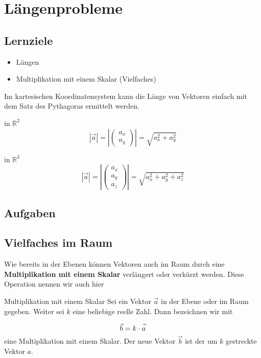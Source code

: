 \section{Längenprobleme}

\subsection*{Lernziele}
\begin{itemize}
\item Längen
\item Multiplikation mit einem Skalar (Vielfaches)
\end{itemize}

Im kartesischen Koordinatensystem kann die Länge von Vektoren einfach
mit dem Satz des Pythagoras ermittelt werden.

\begin{gesetz}{in $\mathbb{R}^2$}{}
  $$|\vec{a}| = \left| \begin{pmatrix} a_x\\a_y\end{pmatrix}  \right|   = \sqrt{a_x^2 + a_y^2}$$
\end{gesetz}

\begin{gesetz}{in $\mathbb{R}^3$}{}
  $$|\vec{a}| =  \left|\begin{pmatrix}a_x\\a_y\\a_z\end{pmatrix}\right| = \sqrt{a_x^2 + a_y^2 + a_z^2}$$
\end{gesetz}


\subsection*{Aufgaben}

\newpage


\subsection{Vielfaches im
  Raum}
Wie bereits in der Ebenen können Vektoren auch im Raum durch eine
\textbf{Multiplikation mit einem Skalar} verlängert oder
verkürzt werden. Diese Operation nennen wir auch hier 

\begin{definition}{Multiplikation mit einem Skalar}{}
  Sei ein Vektor $\vec{a}$ in der Ebene oder im Raum gegeben. Weiter
  sei $k$ eine beliebige reelle Zahl. Dann bezeichnen wir mit
  
  $$\vec{b} = k \cdot{} \vec{\vphantom{b}a}$$
  eine Multiplikation mit einem Skalar. Der neue Vektor $\vec{b}$ ist
  der um $k$ gestreckte Vektor $a$.
\end{definition}

